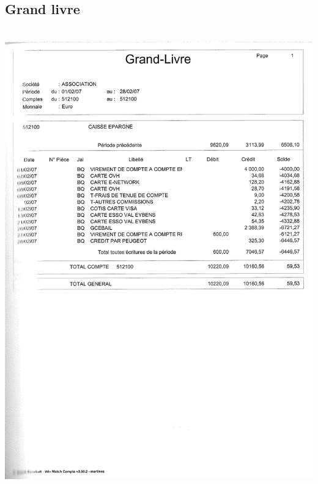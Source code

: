 \subsection{Grand livre}
\begin{center}
\includegraphics[height=20cm]{annexes/images/grand-livre.pdf}
\end{center}

